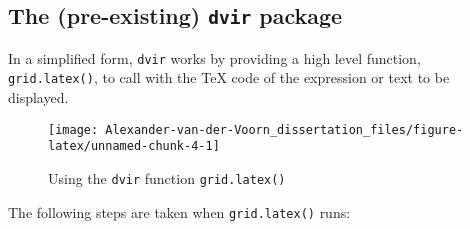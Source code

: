 \documentclass[]{article}
\newenvironment{Shaded}{\begin{snugshade}}{\end{snugshade}}
\newcommand{\KeywordTok}[1]{\textcolor[rgb]{0.13,0.29,0.53}{\textbf{#1}}}
\newcommand{\CharTok}[1]{\textcolor[rgb]{0.31,0.60,0.02}{#1}}
\newcommand{\StringTok}[1]{\textcolor[rgb]{0.31,0.60,0.02}{#1}}
\newcommand{\NormalTok}[1]{#1}
\begin{document}
\subsection{\texorpdfstring{The (pre-existing) \texttt{dvir}
package}{The (pre-existing) dvir package}}\label{dvirDesc}

In a simplified form, \texttt{dvir} works by providing a high level
function, \texttt{grid.latex()}, to call with the \TeX{} code of the
expression or text to be displayed.

\begin{Shaded}
\end{Shaded}

\begin{figure}

{\centering \texttt{[image: Alexander-van-der-Voorn\_dissertation\_files/figure-latex/unnamed-chunk-4-1]} 

}

\caption{Using the \texttt{dvir} function \texttt{grid.latex()}}\label{fig:unnamed-chunk-4}
\end{figure}

The following steps are taken when \texttt{grid.latex()} runs:
\end{document}
